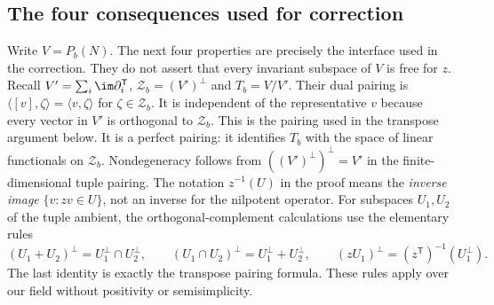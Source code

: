 \documentclass[11pt,a4paper,oneside,openany]{book}
\theoremstyle{definition}\newtheorem{definition}[theorem]{Definition}
\theoremstyle{remark}\newtheorem{remark}[theorem]{Remark}
\numberwithin{equation}{chapter}
\begin{document}
\subsection{The four consequences used for correction}
Write $V=P_b(N)$. The next four properties are precisely the interface used in the
correction. They do not assert that every invariant subspace of $V$
is free for $z$.
Recall $V'=\sum_i\im\partial_i^{\mathsf T}$,
$\mathcal Z_b=(V')^\perp$ and $T_b=V/V'$. Their dual pairing is
$\langle[v],\zeta\rangle=\langle v,\zeta\rangle$ for
$\zeta\in\mathcal Z_b$. It is independent of the representative
$v$ because every vector in $V'$ is orthogonal to $\mathcal Z_b$.
This is the pairing used in the transpose argument below.
It is a perfect pairing: it identifies $T_b$ with the space of
linear functionals on $\mathcal Z_b$. Nondegeneracy follows from
$((V')^\perp)^\perp=V'$ in the finite-dimensional tuple pairing.
The notation $z^{-1}(U)$ in the proof means the \emph{inverse image}
$\{v:zv\in U\}$, not an inverse for the nilpotent operator.
For subspaces $U_1,U_2$ of the tuple ambient, the orthogonal-complement
calculations use the elementary rules
\[
 (U_1+U_2)^\perp=U_1^\perp\cap U_2^\perp,\qquad
 (U_1\cap U_2)^\perp=U_1^\perp+U_2^\perp,\qquad
 (zU_1)^\perp=(z^{\mathsf T})^{-1}(U_1^\perp).
\]
The last identity is exactly the transpose pairing formula. These
rules apply over our field without positivity or semisimplicity.
\end{document}
